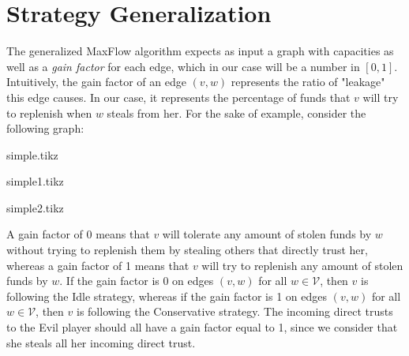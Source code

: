 \section{Strategy Generalization}
  The generalized MaxFlow algorithm expects as input a graph with capacities as well as a \textit{gain factor} for each edge,
  which in our case will be a number in $\left[0, 1\right]$. Intuitively, the gain factor of an edge $\left(v, w\right)$
  represents the ratio of "leakage" this edge causes. In our case, it represents the percentage of funds that $v$ will try to
  replenish when $w$ steals from her. For the sake of example, consider the following graph:
  
  {simple.tikz}
  
  {simple1.tikz}

  {simple2.tikz}

  A gain factor of 0 means that $v$ will tolerate any amount of stolen funds by $w$ without trying to replenish them by stealing
  others that directly trust her, whereas a gain factor of 1 means that $v$ will try to replenish any amount of stolen funds by
  $w$. If the gain factor is 0 on edges $\left(v, w\right)$ for all $w \in \mathcal{V}$, then $v$ is following the Idle
  strategy, whereas if the gain factor is 1 on edges $\left(v, w\right)$ for all $w \in \mathcal{V}$, then $v$ is following the
  Conservative strategy. The incoming direct trusts to the Evil player should all have a gain factor equal to 1, since we
  consider that she steals all her incoming direct trust.
